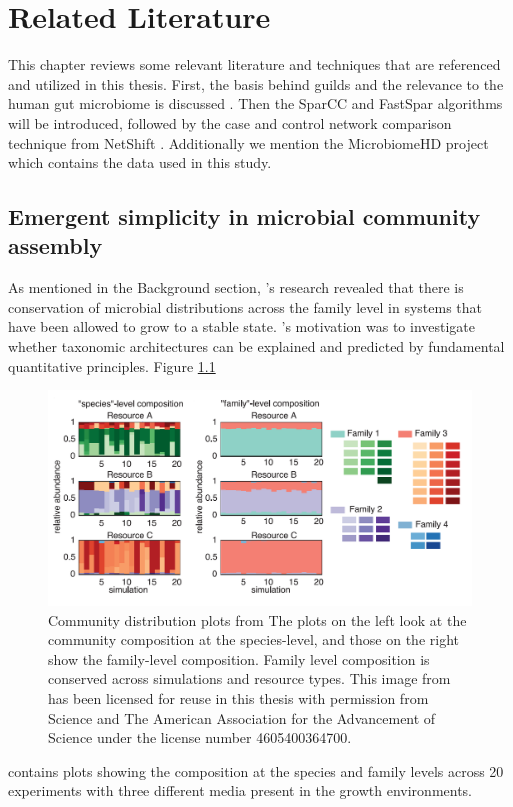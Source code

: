 \chapter{Related Literature}

This chapter reviews some relevant literature and techniques that are referenced and utilized in this thesis. First, the basis behind guilds and the relevance to the human gut microbiome is discussed \citep{Goldford2018}.  Then the SparCC \citep{Friedman2012} and FastSpar \citep{Watts2018} algorithms will be introduced, followed by the case and control network comparison technique from NetShift \citep{Kuntal2018}. Additionally we mention the MicrobiomeHD project \citep{Duvallet2017} which contains the data used in this study.

\section{Emergent simplicity in microbial community assembly}\label{lit-gold}
As mentioned in the Background section, \citeauthor{Goldford2018}'s research revealed that there is conservation of microbial distributions across the family level in systems that have been allowed to grow to a stable state. \citeauthor{Goldford2018}'s motivation was to investigate whether taxonomic architectures can be explained and predicted by fundamental quantitative principles. Figure \ref{fig:rel-gold}
\begin{figure}[!thbp]
    \centering
    \includegraphics[width=0.95\linewidth]{figure/background/goldford_img.png}
    \caption[Community distribution plots from Goldford et al.]{Community distribution plots from \citeauthor{Goldford2018} The plots on the left look at the community composition at the species-level, and those on the right show the family-level composition. Family level composition is conserved across simulations and resource types. This image from \citep{Goldford2018} has been licensed for reuse in this thesis with permission from Science and The American Association for the Advancement of Science under the license number 4605400364700.}
    \label{fig:rel-gold}
\end{figure}
contains plots showing the composition at the species and family levels across 20 experiments with three different media present in the growth environments. 

